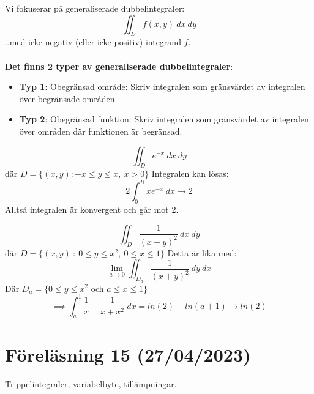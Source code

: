 \documentclass{report}
\begin{document}
\vspace{20pt}
{
Vi fokuserar på generaliserade dubbelintegraler:
\begin{equation*}
\iint_{D}^{} f(x,y) \: dx   \: dy
\end{equation*}
..med icke negativ (eller icke positiv) integrand $ f $.\\\\

\textbf{Det finns 2 typer av generaliserade dubbelintegraler}:
\begin{itemize}
	\item \textbf{Typ 1}: Obegränsad område: Skriv integralen som gränsvärdet av integralen över begränsade områden
	\item \textbf{Typ 2}: Obegränsad funktion: Skriv integralen som gränsvärdet av integralen över områden där funktionen är begränsad.
\end{itemize}
}

{
\begin{equation*}
	\iint_{D}^{} e^{-x} \: dx   \: dy
\end{equation*}
där $ D = \{ (x,y) : -x \le y \le x, \: x > 0 \} $ 
Integralen kan lösas:
\begin{equation*}
	2 \int_{0}^{R} xe^{-x} \: dx \to 2 
\end{equation*}
Alltså integralen är konvergent och går mot 2.
}

\pagebreak
{}
{
\begin{equation*}
\iint_{D}^{} \frac{1}{(x+y)^2}  \: dx   \: dy
\end{equation*}
där $ D = \{ (x,y) \: : \: 0 \le y \le x^2, \: 0 \le x \le 1\}$ 
Detta är lika med:
\begin{equation*}
\lim_{a \to 0} \iint_{D_a}^{} \frac{1}{(x+y)^2}  \: dy   \: dx
\end{equation*}
Där $ D_a = \{ 0 \le y \le x^2$ och $ a \le x \le 1\} $  
\begin{equation*}
\implies \int_{a}^{1} \frac{1}{x} - \frac{1}{x+x^2}  \: dx = ln(2) - ln(a+1) \to ln(2)
\end{equation*}
}

\pagebreak
\section{Föreläsning 15 (27/04/2023)}
Trippelintegraler, variabelbyte, tillämpningar.\\\\
\end{document}
